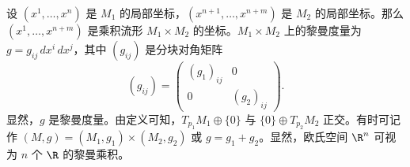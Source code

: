 \begin{figure}[htbp]
  \centering
  
\end{figure}

设 $(x^1,\ldots,x^n)$ 是 $M_1$ 的局部坐标，$(x^{n+1},\ldots,x^{n+m})$ 是 $M_2$ 的局部坐标。那么 $(x^1,\ldots,x^{n+m})$ 是乘积流形 $M_1\times M_2$ 的坐标。$M_1\times M_2$ 上的黎曼度量为 $g=g_{ij}\,dx^i\,dx^j$，其中 $(g_{ij})$ 是分块对角矩阵
\begin{equation*}
  (g_{ij})=\begin{pmatrix}(g_1)_{ij}&0\\0&(g_2)_{ij}\end{pmatrix}.
  \tag{2.32}\label{eq:2.32}
\end{equation*}
显然，$g$ 是黎曼度量。由定义可知，$T_{p_1}M_1\oplus\{0\}$ 与 $\{0\}\oplus T_{p_2}M_2$ 正交。有时可记作 $(M,g)=(M_1,g_1)\times(M_2,g_2)$ 或 $g=g_1+g_2$。显然，欧氏空间 $\R^n$ 可视为 $n$ 个 $\R$ 的黎曼乘积。
